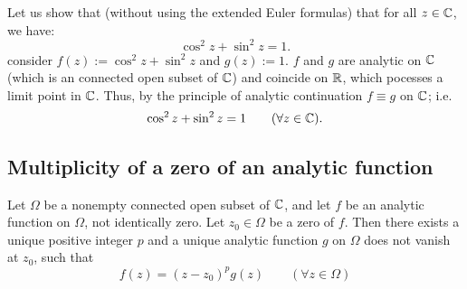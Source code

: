 \begin{example}
Let us show that (without using the extended Euler
formulas) that for all $z \in   \mathbb{C} $, we have: 
\[
\cos ^2  z + \sin  ^2  z = 1.    
\]
consider $f(z)  := \cos ^2  z + \sin ^2  z    $ and $g(z) := 1$. $f$ and $g$ are analytic 
on $\mathbb{C} $ (which is an connected open subset of $\mathbb{C} $) and coincide on $\mathbb{R} $, which pocesses a limit point 
in $\mathbb{C} $. Thus, by the principle of analytic continuation $f \equiv g$ on $\mathbb{C} $; i.e. 
\[
\cos ^2 z + \sin ^2  z = 1 \quad \quad (\forall  z \in   \mathbb{C} ) .
\]
\end{example}
\subsection{Multiplicity of a zero of an analytic function}
\begin{theorem}[]
  Let $\Omega$ be a nonempty connected open subset of $\mathbb{C} $,
  and let $f$ be an analytic function on $\Omega$, not identically zero. Let $z_0 \in   \Omega$ be a zero of $f$. Then there exists a unique
  positive integer $p$ and a unique analytic function 
  $g$ on $\Omega$ does not vanish at $z_0$, such that
  \[
  f(z)  = (z-z_0) ^{p}g(z)  \quad \quad 
  (\forall  z \in   \Omega) 
  \]
\end{theorem}
